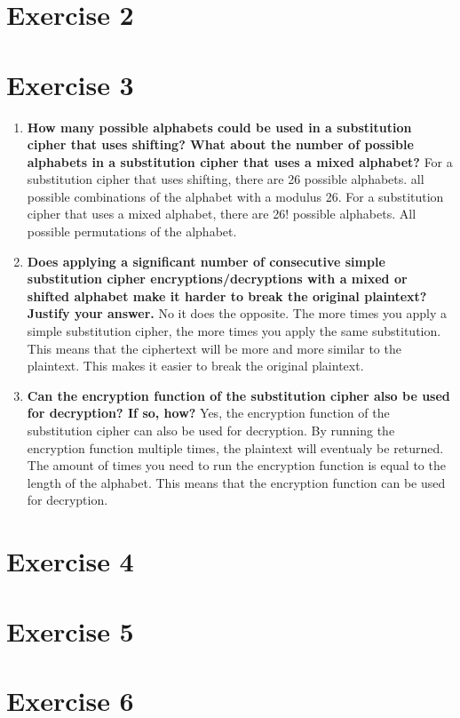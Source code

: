 \documentclass{report}
\begin{document}
\section*{Exercise 2}

\section*{Exercise 3}

\begin{enumerate}
      \item \textbf{How many possible alphabets could be used in a substitution cipher that uses shifting? What about the number of possible alphabets in a substitution cipher that uses a mixed alphabet?}
            For a substitution cipher that uses shifting, there are 26 possible alphabets. all possible combinations of the alphabet with a modulus 26.
            For a substitution cipher that uses a mixed alphabet, there are 26! possible alphabets. All possible permutations of the alphabet.

      \item \textbf{Does applying a significant number of consecutive simple substitution cipher encryptions/decryptions with a mixed or shifted alphabet make it harder to break the original plaintext? Justify your answer.}
            No it does the opposite. The more times you apply a simple substitution cipher, the more times you apply the same substitution. This means that the ciphertext will be more and more similar to the plaintext. This makes it easier to break the original plaintext.

      \item \textbf{Can the encryption function of the substitution cipher also be used for decryption? If so, how?}
            Yes, the encryption function of the substitution cipher can also be used for decryption. By running the encryption function multiple times, the plaintext will eventualy be returned. The amount of times you need to run the encryption function is equal to the length of the alphabet.
            This means that the encryption function can be used for decryption.

\end{enumerate}

\section*{Exercise 4}

\section*{Exercise 5}

\section*{Exercise 6}
\end{document}
